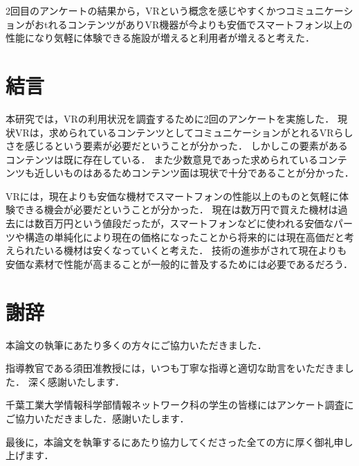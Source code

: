 \documentclass[12pt,a4j]{ltjsarticle}
\begin{document}
2回目のアンケートの結果から，VRという概念を感じやすくかつコミュニケーションがおtれるコンテンツがありVR機器が今よりも安価でスマートフォン以上の性能になり気軽に体験できる施設が増えると利用者が増えると考えた．

\clearpage

\section{結言}
本研究では，VRの利用状況を調査するために2回のアンケートを実施した．
現状VRは，求められているコンテンツとしてコミュニケーションがとれるVRらしさを感じるという要素が必要だということが分かった．
しかしこの要素があるコンテンツは既に存在している．
また少数意見であった求められているコンテンツも近しいものはあるためコンテンツ面は現状で十分であることが分かった．

VRには，現在よりも安価な機材でスマートフォンの性能以上のものと気軽に体験できる機会が必要だということが分かった．
現在は数万円で買えた機材は過去には数百万円という値段だったが，スマートフォンなどに使われる安価なパーツや構造の単純化により現在の価格になったことから将来的には現在高価だと考えられたいる機材は安くなっていくと考えた\cite{VR機材が安価になった理由}．
技術の進歩がされて現在よりも安価な素材で性能が高まることが一般的に普及するためには必要であるだろう．

\clearpage

\section{謝辞}
本論文の執筆にあたり多くの方々にご協力いただきました．

指導教官である須田准教授には，いつも丁寧な指導と適切な助言をいただきました．
深く感謝いたします．

千葉工業大学情報科学部情報ネットワーク科の学生の皆様にはアンケート調査にご協力いただきました．感謝いたします．

最後に，本論文を執筆するにあたり協力してくださった全ての方に厚く御礼申し上げます．
\end{document}
